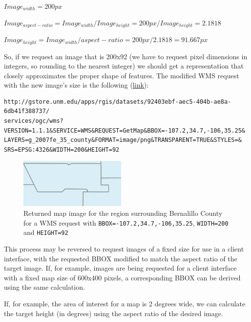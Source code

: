 \documentclass[]{book}
\begin{document}
\(Image_{width} = 200px\)

\(Image_{aspect-ratio} = Image_{width} / Image_{height} = 200px / Image_{height} = 2.1818\)

\(Image_{height} = Image_{width} / {aspect-ratio} = 200px / 2.1818 = 91.667px\)

So, if we request an image that is 200x92 (we have to request pixel
dimensions in integers, so rounding to the nearest integer) we should
get a representation that closely approximates the proper shape of
features. The modified WMS request with the new image's size is the
following
(\href{http://gstore.unm.edu/apps/rgis/datasets/92403ebf-aec5-404b-ae8a-6db41f388737/services/ogc/wms?VERSION=1.1.1\&SERVICE=WMS\&REQUEST=GetMap\&BBOX=-107.2,34.7,-106,35.25\&LAYERS=g_2007fe_35_county\&FORMAT=image/png\&TRANSPARENT=TRUE\&STYLES=\&SRS=EPSG:4326\&WIDTH=200\&HEIGHT=92}{link}):

\begin{verbatim}
http://gstore.unm.edu/apps/rgis/datasets/92403ebf-aec5-404b-ae8a-6db41f388737/
services/ogc/wms?VERSION=1.1.1&SERVICE=WMS&REQUEST=GetMap&BBOX=-107.2,34.7,-106,35.25&
LAYERS=g_2007fe_35_county&FORMAT=image/png&TRANSPARENT=TRUE&STYLES=&
SRS=EPSG:4326&WIDTH=200&HEIGHT=92
\end{verbatim}

\begin{figure}[htbp]
\centering
\includegraphics{images/bernalillo_02.png}
\caption{Returned map image for the region surrounding Bernalillo County
for a WMS request with \texttt{BBOX=-107.2,34.7,-106,35.25},
\texttt{WIDTH=200} and \texttt{HEIGHT=92}}
\end{figure}

This process may be reversed to request images of a fixed size for use
in a client interface, with the requested BBOX modified to match the
aspect ratio of the target image. If, for example, images are being
requested for a client interface with a fixed map size of 600x400
pixels, a corresponding BBOX can be derived using the same calculation.

If, for example, the area of interest for a map is 2 degrees wide, we
can calculate the target height (in degrees) using the aspect ratio of
the desired image.
\end{document}
